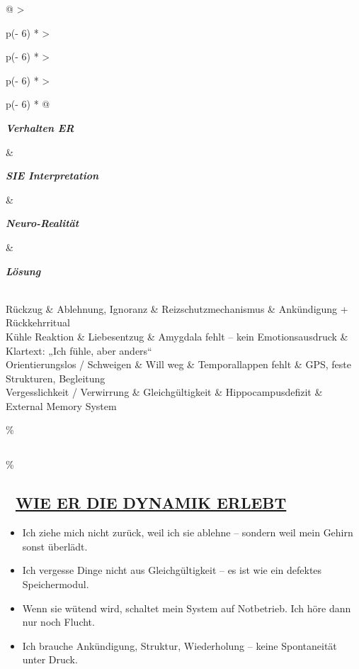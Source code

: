 \begin{longtable}[]{@{}
  >{\raggedright\arraybackslash}p{(\columnwidth - 6\tabcolsep) * }
  >{\raggedright\arraybackslash}p{(\columnwidth - 6\tabcolsep) * }
  >{\raggedright\arraybackslash}p{(\columnwidth - 6\tabcolsep) * }
  >{\raggedright\arraybackslash}p{(\columnwidth - 6\tabcolsep) * }@{}}
\toprule\noalign{}
\begin{minipage}[b]{\linewidth}\raggedright
\emph{\textbf{Verhalten ER}}
\end{minipage} \& \begin{minipage}[b]{\linewidth}\raggedright
\emph{\textbf{SIE Interpretation}}
\end{minipage} \& \begin{minipage}[b]{\linewidth}\raggedright
\emph{\textbf{Neuro-Realität}}
\end{minipage} \& \begin{minipage}[b]{\linewidth}\raggedright
\emph{\textbf{Lösung}}
\end{minipage} \\
\midrule\noalign{}
\endhead
\bottomrule\noalign{}
\endlastfoot
Rückzug \& Ablehnung, Ignoranz \& Reizschutzmechanismus \& Ankündigung + Rückkehrritual \\
Kühle Reaktion \& Liebesentzug \& Amygdala fehlt -- kein Emotionsausdruck \& Klartext: „Ich fühle, aber anders`` \\
Orientierungslos / Schweigen \& Will weg \& Temporallappen fehlt \& GPS, feste Strukturen, Begleitung \\
Vergesslichkeit / Verwirrung \& Gleichgültigkeit \& Hippocampusdefizit \& External Memory System \\
\end{longtable}

\hypertarget{section}{\%
\subsection{}\label{section}}

\hypertarget{wie-er-die-dynamik-erlebt}{\%
\subsection{\texorpdfstring{🧩 \textbf{\ul{WIE ER DIE DYNAMIK ERLEBT}}}{🧩 WIE ER DIE DYNAMIK ERLEBT}}\label{wie-er-die-dynamik-erlebt}}

\begin{itemize}
\tightlist
\item
  Ich ziehe mich nicht zurück, weil ich sie ablehne -- sondern weil mein Gehirn sonst überlädt.
\item
  Ich vergesse Dinge nicht aus Gleichgültigkeit -- es ist wie ein defektes Speichermodul.
\item
  Wenn sie wütend wird, schaltet mein System auf Notbetrieb. Ich höre dann nur noch Flucht.
\item
  Ich brauche Ankündigung, Struktur, Wiederholung -- keine Spontaneität unter Druck.
\end{itemize}

